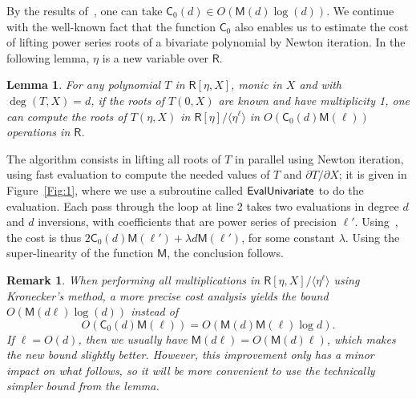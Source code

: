 \documentclass[amsthm]{elsart}
\def\C {\ensuremath{\mathsf{C}}}
\def\M {\ensuremath{\mathsf{M}}}
\def\rng {\ensuremath{\mathsf{R}}}
\theoremstyle{plain}
\newtheorem{Lemma}{Lemma}
\newtheorem{Remark}{Remark}
\begin{document}
\smallskip\noindent
By the results of~\cite[Chapter 10]{GaGe99}, one can take $\C_0(d) \in
O(\M(d)\log(d))$. We continue with the well-known fact that the function
$\C_0$ also enables us to estimate the cost of lifting power series
roots of a bivariate polynomial by Newton iteration. In the following
lemma, $\eta$ is a new variable over $\rng$.

\begin{Lemma}\label{lemma:lift}
  For any polynomial $T$ in $\rng[\eta,X]$, monic in $X$ and with
  $\deg(T,X)=d$, if the roots of $T(0,X)$ are known and have
  multiplicity 1, one can compute the roots of $T(\eta,X)$ in
  $\rng[\eta]/\langle \eta^\ell\rangle$ in $O(\C_0(d)\M(\ell))$
  operations in $\rng$.
\end{Lemma}

\begin{pf}
  The algorithm consists in lifting all roots of $T$ in parallel using
  Newton iteration, using fast evaluation to compute the needed values
  of $T$ and $\partial T/ \partial X$; it is given in
  Figure~\ref{Fig:1}, where we use a subroutine called ${\sf
    EvalUnivariate}$ to do the evaluation.  Each pass through the loop
  at line 2 takes two evaluations in degree $d$ and $d$ inversions,
  with coefficients that are power series of precision
  $\ell'$. Using~\cite[Chapter~9]{GaGe99}, the cost is thus $2 \C_0(d)
  \M(\ell') + \lambda d \M(\ell')$, for some constant $\lambda$. Using
  the super-linearity of the function $\M$, the conclusion follows.
\end{pf}

\begin{Remark}\textup{
  When performing all multiplications in
  $\rng[\eta,X]/\langle \eta^\ell\rangle$ using Kronecker's method,
  a more precise cost analysis yields the bound $O(\M(d \ell) \log(d))$
  instead of
  $$O(\C_0(d) \M(\ell)) = O(\M(d) \M(\ell) \log d).$$
  If $\ell=O(d)$, then we usually have $\M(d \ell) = O(\M(d) \ell)$,
  which makes the new bound slightly better.
  However, this improvement only has a minor impact on what follows,
  so it will be more convenient to use the technically simpler bound
  from the lemma.}
\end{Remark}
\end{document}
